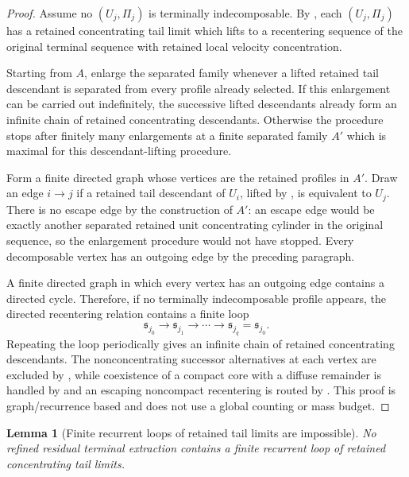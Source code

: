 \documentclass[11pt]{amsart}
\numberwithin{equation}{section}
\theoremstyle{plain}
\newtheorem{lemma}[lemma]{Lemma}
\theoremstyle{definition}
\theoremstyle{remark}
\begin{document}
\begin{proof}
Assume no \((U_j,\Pi_j)\) is terminally indecomposable.  By
, each
\((U_j,\Pi_j)\) has a retained concentrating tail limit which lifts to a
recentering sequence of the original terminal sequence with retained local
velocity concentration.

Starting from \(A\), enlarge the separated family whenever a lifted retained
tail descendant is separated from every profile already selected.  If this
enlargement can be carried out indefinitely, the successive lifted descendants
already form an infinite chain of retained concentrating descendants.  Otherwise the procedure
stops after finitely many enlargements at a finite separated family \(A'\)
which is maximal for this descendant-lifting procedure.

Form a finite directed graph whose vertices are the retained profiles in
\(A'\).  Draw an edge \(i\to j\) if a retained tail descendant of \(U_i\),
lifted by , is equivalent to \(U_j\).
There is no escape edge by the construction of \(A'\): an escape edge would be
exactly another separated retained unit concentrating cylinder in the original
sequence, so the enlargement procedure would not have stopped.  Every
decomposable vertex has an outgoing edge by the preceding paragraph.

A finite directed graph in which every vertex has an outgoing edge contains a
directed cycle.  Therefore, if no terminally indecomposable profile appears, the
directed recentering relation contains a finite loop
\[
   \mathfrak s_{j_0}\to\mathfrak s_{j_1}\to\cdots
   \to\mathfrak s_{j_q}=\mathfrak s_{j_0}.
\]
Repeating the loop periodically gives an infinite chain of retained concentrating descendants.  The
nonconcentrating successor alternatives at each vertex are excluded by
, while coexistence of a compact core with a
diffuse remainder is handled by  and an
escaping noncompact recentering is routed by
.  This proof is graph/recurrence based and
does not use a global counting or mass budget.
\end{proof}

\begin{lemma}[Finite recurrent loops of retained tail limits are impossible]
\label{lem:no-finite-recurrent-cycle}
No refined residual terminal extraction contains a finite recurrent loop of retained
concentrating tail limits.
\end{lemma}
\end{document}
